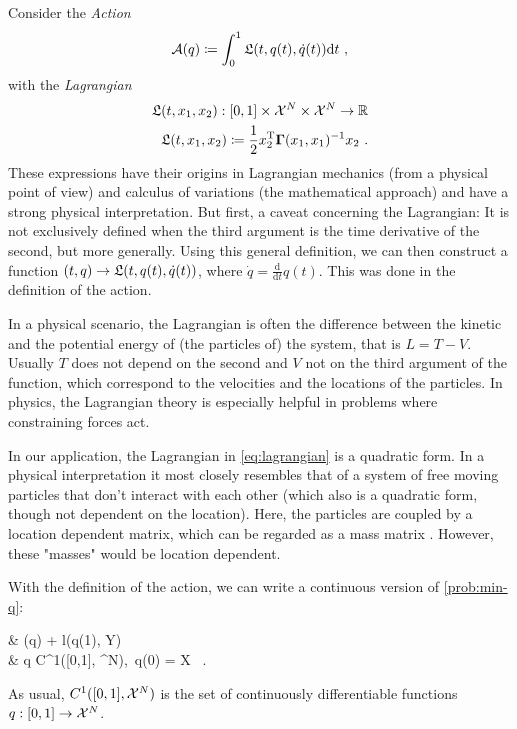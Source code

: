 Consider the \emph{Action}
\begin{equation}
\label{eq:action}
	\cA(q) \coloneqq \int_{0}^{1} \fL(t, q(t), \dot{q}(t)) \mathrm{d}t \ ,
\end{equation}
with the \emph{Lagrangian}
\begin{equation}
\label{eq:lagrangian}
	\begin{split}
		\mathfrak{L}(t, x_1, x_2): [0, 1] \times \mathcal{X}^N \times \mathcal{X}^N \rightarrow \mathbb{R}\\ 
		\mathfrak{L}(t, x_1, x_2) \coloneqq \frac{1}{2}  x_2^\mathrm{T} \mathbf{\Gamma}(x_1, x_1)^{-1} x_2 \ .
	\end{split}
\end{equation}
These expressions have their origins in Lagrangian mechanics (from a physical point of view) and calculus of variations (the mathematical approach) and have a strong physical interpretation.
But first, a caveat concerning the Lagrangian:
It is not exclusively defined when the third argument is the time derivative of the second, but more generally.
Using this general definition, we can then construct a function $(t, q) \rightarrow \mathfrak{L}(t, q(t), \dot{q}(t))$, where $\dot{q} = \frac{\mathrm{d}}{\mathrm{d}t}q(t)$.
This was done in the definition of the action.

In a physical scenario, the Lagrangian is often the difference between the kinetic and the potential energy of (the particles of) the system, that is $L = T - V$.
Usually $T$ does not depend on the second and $V$ not on the third argument of the function, which correspond to the velocities and the locations of the particles.
In physics, the Lagrangian theory is especially helpful in problems where constraining forces act.

In our application, the Lagrangian in \cref{eq:lagrangian} is a quadratic form.
In a physical interpretation it most closely resembles that of a system of free moving particles that don't interact with each other (which also is a quadratic form, though not dependent on the location).
Here, the particles are coupled by a location dependent matrix, which can be regarded as a mass matrix \cite{marsden10}.
However, these "masses" would be location dependent.

With the definition of the action, we can write a continuous version of \cref{prob:min-q}:
\begin{problem}
\label{prob:cont-least-action}
	\begin{cases}
		 & \nu \cA(q) + l(q(1), Y)\\
		 & q \in C^1([0,1], \cX^N),\ q(0) = X \ .
	\end{cases}
\end{problem}
As usual, $C^1([0,1], \mathcal{X}^N)$ is the set of continuously differentiable functions $q: [0, 1] \rightarrow \mathcal{X}^N$.

